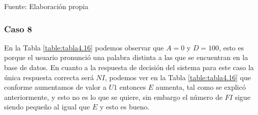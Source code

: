 \begin{center}
\begin{table}[H]
\centering
\caption{\small{Resultados para obtener U1 en el caso 7.}}
\label{table:tabla4.15}
\vskip 0.2cm
\begin{center}
\vskip 0.2cm
{\small{Fuente: Elaboración propia}}
\end{center}
\end{table}
\end{center}

\subsubsection{Caso 8}
En la Tabla \ref{table:tabla4.16} podemos observar que $A = 0$ y $D = 100$, esto es porque el usuario pronunció una palabra distinta a las que se encuentran en la base de datos.
\vskip 0.5cm
En cuanto a la respuesta de decisión del sistema para este caso la única respuesta correcta será $NI$, podemos ver en la Tabla \ref{table:tabla4.16} que conforme aumentamos de valor a $U1$ entonces $E$ aumenta, tal como se explicó anteriormente, y esto no es lo que se quiere, sin embargo el número de $FI$ sigue siendo pequeño al igual que $E$ y esto es bueno.

